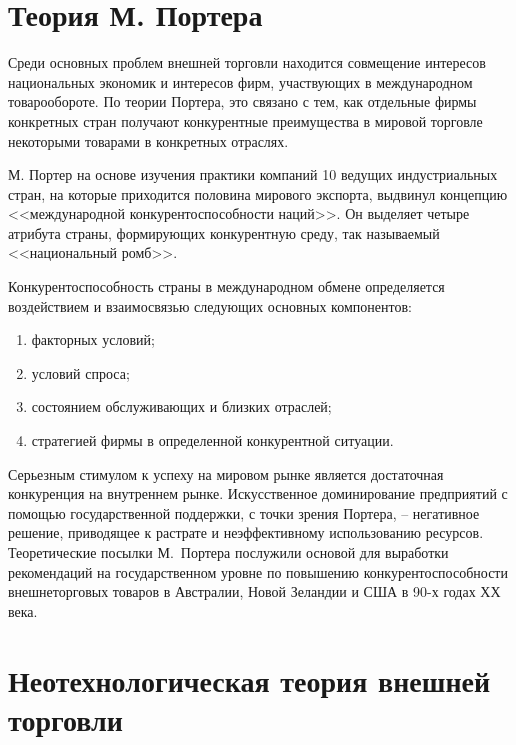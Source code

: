 \vspace*{2em} %

\section{Теория М. Портера}

Среди основных проблем внешней торговли находится совмещение интересов
национальных экономик и интересов фирм, участвующих в международном
товарообороте. По теории Портера, это связано с тем, как отдельные фирмы
конкретных стран получают конкурентные преимущества в мировой торговле
некоторыми товарами в конкретных отраслях.

М. Портер на основе изучения практики компаний 10 ведущих индустриальных стран,
на которые приходится половина мирового экспорта, выдвинул концепцию
<<международной конкурентоспособности наций>>. Он выделяет четыре атрибута
страны, формирующих конкурентную среду, так называемый <<национальный ромб>>.

Конкурентоспособность страны в международном обмене определяется воздействием и
взаимосвязью следующих основных компонентов:
\begin{enumerate}
    \item факторных условий;
    \item условий спроса;
    \item состоянием обслуживающих и близких отраслей;
    \item стратегией фирмы в определенной конкурентной ситуации.
\end{enumerate}

Серьезным стимулом к успеху на мировом рынке является достаточная конкуренция
на внутреннем рынке. Искусственное доминирование предприятий с помощью
государственной поддержки, с точки зрения Портера, -- негативное решение,
приводящее к растрате и неэффективному использованию ресурсов. Теоретические
посылки М.~Портера послужили основой для выработки рекомендаций на
государственном уровне по повышению конкурентоспособности внешнеторговых
товаров в Австралии, Новой Зеландии и США в 90-х годах ХХ века.

\vspace*{2em} %

\section{Неотехнологическая теория внешней торговли}

